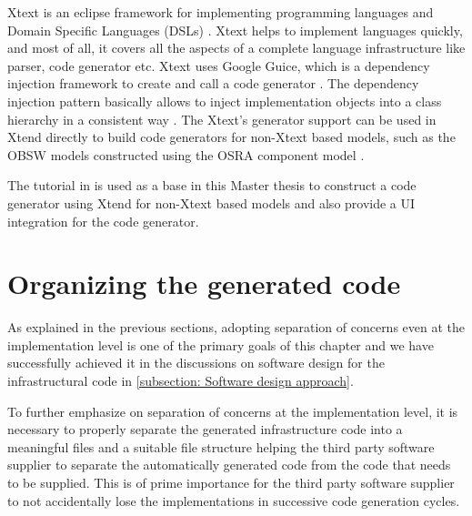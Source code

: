 Xtext is an eclipse framework for implementing programming languages and Domain Specific Languages (DSLs) \cite{Xtend}. Xtext helps to implement languages quickly, and most of all, it covers all the aspects of a complete language infrastructure like parser, code generator etc. Xtext uses Google Guice, which is a dependency injection framework to create and call a code generator \cite{Xtend}. The dependency injection pattern basically allows to inject implementation objects into a class hierarchy in a consistent way \cite{InvOfCntrlurl}. The Xtext's generator support can be used in Xtend directly to build code generators for non-Xtext based models, such as the OBSW models constructed using the OSRA component model \cite{CodeGenEclXtend}. 

The tutorial in \cite{CodeGenNonXtext} is used as a base in this Master thesis to construct a code generator using Xtend for non-Xtext based models and also provide a UI integration for the code generator.

\section{Organizing the generated code}
\label{section: Code organization}
As explained in the previous sections, adopting separation of concerns even at the implementation level is one of the primary goals of this chapter and we have successfully achieved it in the discussions on software design for the infrastructural code in \cref{subsection: Software design approach}. 

To further emphasize on separation of concerns at the implementation level, it is necessary to properly separate the generated infrastructure code into a meaningful files and a suitable file structure helping the third party software supplier to separate the automatically generated code from the code that needs to be supplied. This is of prime importance for the third party software supplier to not accidentally lose the implementations in successive code generation cycles. 

